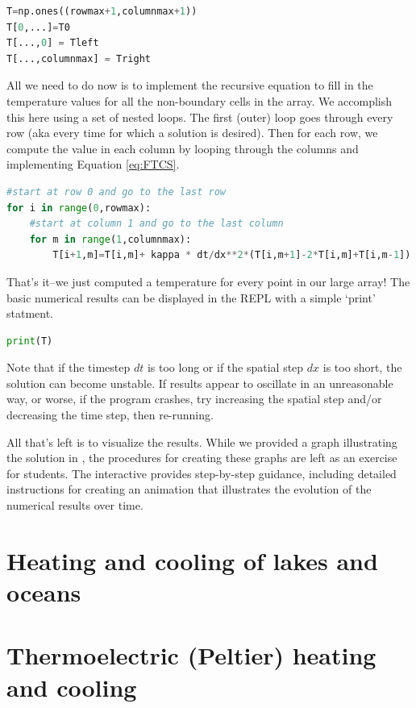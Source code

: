 \begin{lstlisting}[language=Python]
T=np.ones((rowmax+1,columnmax+1))
T[0,...]=T0
T[...,0] = Tleft
T[...,columnmax] = Tright
\end{lstlisting}

All we need to do now is to implement the recursive equation to fill in the temperature values for all the non-boundary cells in the array.
We accomplish this here using a set of nested loops.
The first (outer) loop goes through every row (aka every time for which a solution is desired).
Then for each row, we compute the value in each column by looping through the columns and implementing Equation \ref{eq:FTCS}.

\begin{lstlisting}[language=Python]
#start at row 0 and go to the last row
for i in range(0,rowmax):   
    #start at column 1 and go to the last column
    for m in range(1,columnmax):  
        T[i+1,m]=T[i,m]+ kappa * dt/dx**2*(T[i,m+1]-2*T[i,m]+T[i,m-1])
\end{lstlisting}

That's it--we just computed a temperature for every point in our large array! The basic numerical results can be displayed in the REPL with a simple `print' statment.
\begin{lstlisting}[language=Python]
print(T)
\end{lstlisting}

Note that if the timestep $dt$ is too long or if the spatial step $dx$ is too short, the solution can become unstable.
If results appear to oscillate in an unreasonable way, or worse, if the program crashes, try increasing the spatial step and/or decreasing the time step, then re-running.

All that's left is to visualize the results.
While we provided a graph illustrating the solution  in , the procedures for creating these graphs are left as an exercise for students.
The interactive  provides step-by-step guidance, including detailed instructions for creating an animation that illustrates the evolution of the numerical results over time.

\newpage

\section{\color{gray} Heating and cooling of lakes and oceans \color{black}}
\section{\color{gray} Thermoelectric (Peltier) heating and cooling \color{black}}
